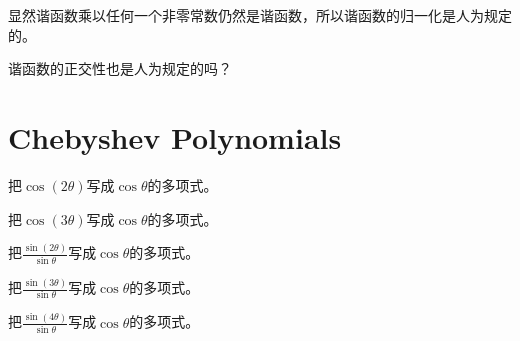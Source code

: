 \documentclass[CJK]{beamer}
\begin{document}
\begin{frame}
\bch


显然谐函数乘以任何一个非零常数仍然是谐函数，所以谐函数的归一化是人为规定的。


谐函数的正交性也是人为规定的吗？

\ech
\end{frame}


\section{Chebyshev Polynomials}


\begin{frame}
\bch


把$\cos(2\theta)$写成$\cos\theta$的多项式。
\ech
\end{frame}


\begin{frame}
\bch


把$\cos(3\theta)$写成$\cos\theta$的多项式。
\ech
\end{frame}


\begin{frame}
\bch


把$\frac{\sin(2\theta)}{\sin\theta}$写成$\cos\theta$的多项式。
\ech
\end{frame}


\begin{frame}
\bch


把$\frac{\sin(3\theta)}{\sin\theta}$写成$\cos\theta$的多项式。
\ech
\end{frame}


\begin{frame}
\bch


把$\frac{\sin(4\theta)}{\sin\theta}$写成$\cos\theta$的多项式。
\ech
\end{frame}
\end{document}
